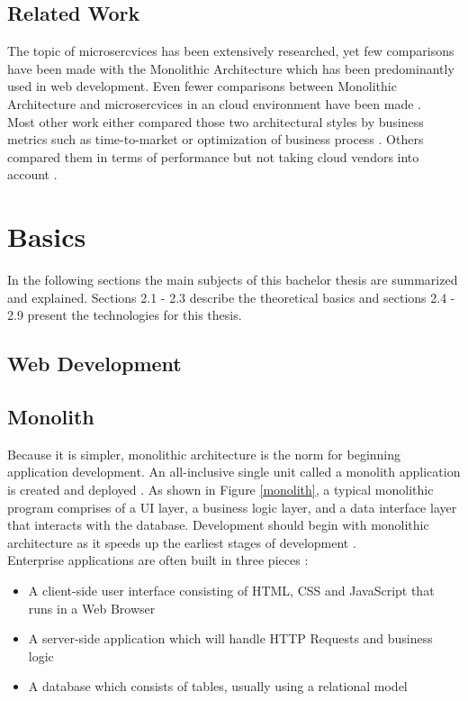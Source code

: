 \documentclass[BIF,Bachelor,nenglish]{twbook}%
\begin{document}
\section{Related Work}
The topic of microsercvices has been extensively researched, yet few comparisons have been made with the Monolithic Architecture which has been predominantly used in web development. Even fewer comparisons between Monolithic Architecture and microsercvices in an cloud environment have been made \cite{vil2015, vil2016}.
\\
Most other work either compared those two architectural styles by business metrics \cite{frommonotomicro} such as time-to-market or optimization of business process \cite{whycompanies}. Others compared them in terms of performance but not taking cloud vendors into account \cite{comp, flygare, compmonomicro}.

\chapter{Basics}
In the following sections the main subjects of this bachelor thesis are summarized and explained. Sections 2.1 - 2.3 describe the theoretical basics and sections 2.4 - 2.9 present the technologies for this thesis.

\section{Web Development}

\section{Monolith}
Because it is simpler, monolithic architecture is the norm for beginning application development. An all-inclusive single unit called a monolith application is created and deployed \cite{comp}. As shown in Figure \ref{monolith}, a typical monolithic program comprises of a \ac{UI} layer, a business logic layer, and a data interface layer that interacts with the database. Development should begin with monolithic architecture as it speeds up the earliest stages of development \cite{chllng}.
\\
Enterprise applications are often built in three pieces \cite{fow2014}:
\begin{itemize}
  \item A client-side user interface consisting of \ac{HTML}, \ac{CSS} and JavaScript that runs in a Web Browser
  \item A server-side application which will handle \ac{HTTP} Requests and business logic
  \item A database which consists of tables, usually using a relational model
\end{itemize}
\end{document}
